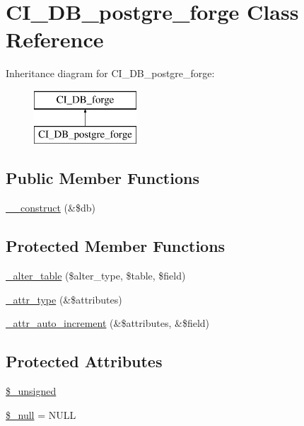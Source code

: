 \hypertarget{class_c_i___d_b__postgre__forge}{}\section{C\+I\+\_\+\+D\+B\+\_\+postgre\+\_\+forge Class Reference}
\label{class_c_i___d_b__postgre__forge}
Inheritance diagram for C\+I\+\_\+\+D\+B\+\_\+postgre\+\_\+forge\+:\begin{figure}[H]
\begin{center}
\leavevmode
\includegraphics[height=2.000000cm]{class_c_i___d_b__postgre__forge}
\end{center}
\end{figure}
\subsection*{Public Member Functions}
\begin{DoxyCompactItemize}
\item 
\mbox{\hyperlink{class_c_i___d_b__postgre__forge_aaf2ef772755ec6f361d44e16cc9ffd69}{\+\_\+\+\_\+construct}} (\&\$db)
\end{DoxyCompactItemize}
\subsection*{Protected Member Functions}
\begin{DoxyCompactItemize}
\item 
\mbox{\hyperlink{class_c_i___d_b__postgre__forge_a41c6cae02f2fda8b429ad0afb9509426}{\+\_\+alter\+\_\+table}} (\$alter\+\_\+type, \$table, \$field)
\item 
\mbox{\hyperlink{class_c_i___d_b__postgre__forge_a8553be952084c6f7cdfff370a1d14f6b}{\+\_\+attr\+\_\+type}} (\&\$attributes)
\item 
\mbox{\hyperlink{class_c_i___d_b__postgre__forge_a2a013a5932439c3c44f0dad3436525f7}{\+\_\+attr\+\_\+auto\+\_\+increment}} (\&\$attributes, \&\$field)
\end{DoxyCompactItemize}
\subsection*{Protected Attributes}
\begin{DoxyCompactItemize}
\item 
\mbox{\hyperlink{class_c_i___d_b__postgre__forge_aae977ae6d61fa183f0b25422b6ddc31c}{\$\+\_\+unsigned}}
\item 
\mbox{\hyperlink{class_c_i___d_b__postgre__forge_ae58fe6a5104d4a069a49b27533ce808f}{\$\+\_\+null}} = \textquotesingle{}N\+U\+LL\textquotesingle{}
\end{DoxyCompactItemize}
